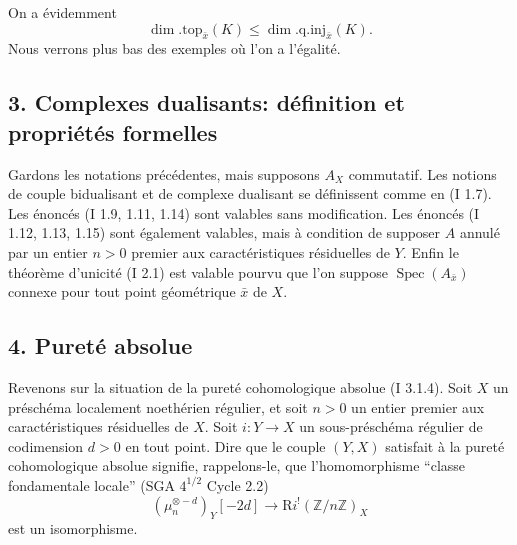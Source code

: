 \documentclass[11pt]{article}
\DeclareMathOperator{\Spec}{Spec}
\newcommand{\R}{\mathrm{R}}
\newcommand{\Z}{\mathbb{Z}}
\providecommand{\R}{\mathrm R}
\providecommand{\Z}{\mathbb Z}
\providecommand{\Spec}{\operatorname{Spec}}
\providecommand{\Spec}{\operatorname{Spec}}
\providecommand{\Spec}{\operatorname{Spec}}
\providecommand{\Spec}{\operatorname{Spec}}
\begin{document}
On a évidemment
\[
        \dim.\mathrm{top}_{\bar{x}}(K)\leq \dim.\mathrm{q.inj}_{\bar{x}}(K).
\]
Nous verrons plus bas des exemples où l'on a l'égalité.

\subsection*{3. Complexes dualisants: définition et propriétés formelles}

Gardons les notations précédentes, mais supposons $A_X$ commutatif. Les notions de couple bidualisant et de complexe dualisant se définissent comme en (I 1.7). Les énoncés (I 1.9, 1.11, 1.14) sont valables sans modification. Les énoncés (I 1.12, 1.13, 1.15) sont également valables, mais à condition de supposer $A$ annulé par un entier $n>0$ premier aux caractéristiques résiduelles de $Y$. Enfin le théorème d'unicité (I 2.1) est valable pourvu que l'on suppose $\Spec(A_{\bar{x}})$ connexe pour tout point géométrique $\bar{x}$ de $X$.

\subsection*{4. Pureté absolue}

Revenons sur la situation de la pureté cohomologique absolue (I 3.1.4). Soit $X$ un préschéma localement noethérien régulier, et soit $n>0$ un entier premier aux caractéristiques résiduelles de $X$. Soit $i:Y\to X$ un sous-préschéma régulier de codimension $d>0$ en tout point. Dire que le couple $(Y,X)$ satisfait à la pureté cohomologique absolue signifie, rappelons-le, que l'homomorphisme ``classe fondamentale locale'' (SGA $4^{1/2}$ Cycle 2.2)
\begin{equation}\tag{4.1}
        (\mu_n^{\otimes -d})_Y[-2d]\longrightarrow \R i^!(\Z/n\Z)_X
\end{equation}
est un isomorphisme.
\end{document}

